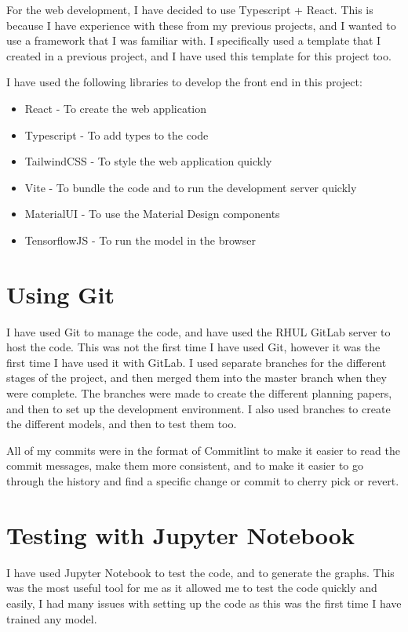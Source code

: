 \documentclass[]{final_report}
\begin{document}
For the web development, I have decided to use Typescript + React. This is because I have experience with these from my previous projects, and I wanted to use a framework that I was familiar with. I specifically used a template\cite{TypescriptProjectTemplate} that I created in a previous project, and I have used this template for this project too.

I have used the following libraries to develop the front end in this project:
\begin{itemize}
  \item React\cite{React} - To create the web application
  \item Typescript\cite{Typescript} - To add types to the code
  \item TailwindCSS\cite{tailwindcss} - To style the web application quickly
  \item Vite\cite{Vite} - To bundle the code and to run the development server quickly
  \item MaterialUI\cite{MaterialUI} - To use the Material Design components
  \item TensorflowJS\cite{smilkov2019tensorflowjs} - To run the model in the browser
\end{itemize}


\section{Using Git}
I have used Git to manage the code, and have used the RHUL GitLab server to host the code.
This was not the first time I have used Git, however it was the first time I have used it with GitLab.
I used separate branches for the different stages of the project, and then merged them into the master branch when they were complete.
The branches were made to create the different planning papers, and then to set up the development environment.
I also used branches to create the different models, and then to test them too.

All of my commits were in the format of Commitlint\cite{CommitLint} to make it easier to read the commit messages, make them more consistent,
and to make it easier to go through the history and find a specific change or commit to cherry pick or revert.

\section{Testing with Jupyter Notebook}
I have used Jupyter Notebook to test the code, and to generate the graphs.
This was the most useful tool for me as it allowed me to test the code quickly and easily,
I had many issues with setting up the code as this was the first time I have trained any model.
\end{document}

